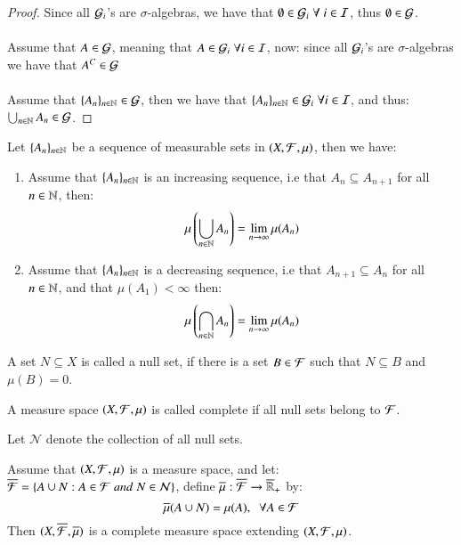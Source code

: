 \begin{proof}
Since all $\mathcal{G}_{i}$'s are $\sigma$-algebras, we have that $\emptyset \in \mathcal{G}_{i}\; \forall \; i \in \mathcal{I}$, thus $\emptyset \in \mathcal{G}$. 
\\~\\ 
Assume that $A \in \mathcal{G}$, meaning that $A \in \mathcal{G}_{i}\;\forall i \in \mathcal{I}$, now: since all $\mathcal{G}_{i}$'s are $\sigma$-algebras we have that $A^{C} \in \mathcal{G}$
\\~\\
Assume that $\{A_{n}\}_{n\in \mathbb{N}} \in \mathcal{G}$, then we have that $\{A_{n}\}_{n\in \mathbb{N}} \in \mathcal{G}_{i}\;\forall i\in \mathcal{I}$, and thus: $\bigcup_{n\in \mathbb{N}}A_{n} \in \mathcal{G}$.
\end{proof}


\begin{proposition}
Let $\{A_{n}\}_{n\in \mathbb{N}}$ be a sequence of measurable sets in $(X, \mathcal{F}, \mu)$, then we have: 
\begin{enumerate}[label = (\roman*), leftmargin=*]
    \item Assume that $\{A_{n}\}_{n\in \mathbb{N}}$ is an increasing sequence, i.e that $A_{n} \subseteq A_{n+1}$ for all $n\in \mathbb{N}$, then: 
    \[\mu\left(\bigcup_{n\in \mathbb{N}}A_{n}\right) = \lim_{n\to \infty}\mu(A_{n})
    \]
    \item Assume that $\{A_{n}\}_{n\in \mathbb{N}}$ is a decreasing sequence, i.e that $A_{n+1} \subseteq A_{n}$ for all $n\in \mathbb{N}$, and that $\mu(A_{1}) < \infty$ then: 
    \[\mu\left(\bigcap_{n\in \mathbb{N}}A_{n}\right) = \lim_{n\to \infty}\mu(A_{n})
    \]
\end{enumerate}
\end{proposition}

\begin{definition}
A set $N\subseteq X$ is called a null set, if there is a set $B\in \mathcal{F}$ such that $N\subseteq B$ and $\mu(B) = 0$. 
\end{definition}

\begin{definition}
A measure space $(X,\mathcal{F}, \mu)$ is called complete if all null sets belong to $\mathcal{F}$.
\end{definition}

Let $\mathcal{N}$ denote the collection of all null sets.

\begin{theorem}
Assume that $(X, \mathcal{F}, \mu)$ is a measure space, and let:\\
$\overline{\mathcal{F}} = \{A\cup N: A\in \mathcal{F} \; and\; N\in \mathcal{N} \}$, define $\overline{\mu}:\overline{\mathcal{F}} \to \overline{\mathbb{R}}_{+}$ by: 
\[\overline{\mu}(A\cup N) = \mu(A), \;\; \forall A \in \mathcal{F}
\]
Then $(X,\overline{\mathcal{F}}, \overline{\mu})$ is a complete measure space extending $(X,\mathcal{F},\mu)$. 
\end{theorem}


